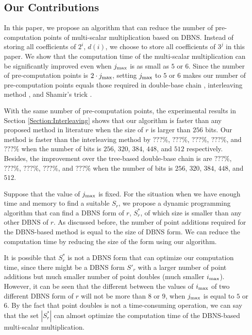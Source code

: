 \subsection{Our Contributions}

In this paper, we propose an algorithm that can reduce the number of pre-computation points of multi-scalar multiplication based on DBNS. Instead of storing all coefficients of $2^i$, $d(i)$, we choose to store all coefficients of $3^j$ in this paper. We show that the computation time of the multi-scalar multiplication can be significantly improved even when $j_{\rm max}$ is as small as $5$ or $6$. Since the number of pre-computation points is $2 \cdot j_{\rm max}$, setting $j_{\rm max}$ to $5$ or $6$ makes our number of pre-computation points equals those required in double-base chain \cite{experiment,dbc1}, interleaving method \cite{interleaving}, and Shamir's trick \cite{enlarged4}.

With the same number of pre-computation points, the experimental results in Section \ref{Section:Interleaving} shows that our algorithm is faster than any proposed method in literature when the size of $r$ is larger than $256$ bits. Our method is faster than the interleaving method by $???\%$, $???\%$, $???\%$, $???\%$, and $???\%$ when the number of bits is $256$, $320$, $384$, $448$, and $512$ respectively. Besides, the improvement over the tree-based double-base chain is are  $???\%$, $???\%$, $???\%$, $???\%$, and $???\%$ when the number of bits is $256$, $320$, $384$, $448$, and $512$.

Suppose that the value of $j_{\rm max}$ is fixed. For the situation when we have enough time and memory to find a suitable $S_r$, we propose a dynamic programming algorithm that can find a DBNS form of $r$, $S^*_r$, of which size is smaller than any other DBNS of $r$. As discussed before, the number of point additions required for the DBNS-based method is equal to the size of DBNS form. We can reduce the computation time by reducing the size of the form using our algorithm.

It is possible that $S^*_r$ is not a DBNS form that can optimize our computation time, since there might be a DBNS form $S'_r$ with a larger number of point additions but much smaller number of point doubles (much smaller $i_{\rm max}$). However, it can be seen that the different between the values of $i_{\rm max}$ of two different DBNS form of $r$ will not be more than $8$ or $9$, when $j_{\rm max}$ is equal to $5$ or $6$. By the fact that point doubles is not a time-consuming operation, we can say that the set $|S^*_r|$ can almost optimize the computation time of the DBNS-based multi-scalar multiplication.


